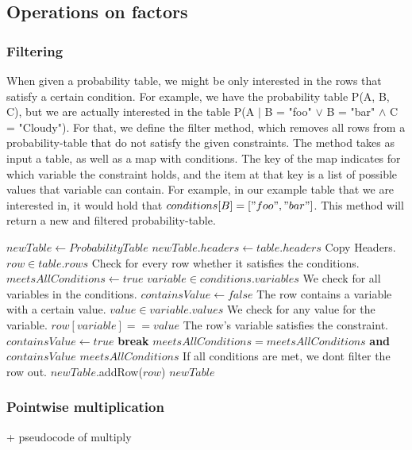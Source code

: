 \documentclass[10pt,a4paper]{article}
\begin{document}
\subsection{Operations on factors}
\subsubsection{Filtering}
When given a probability table, we might be only interested in the rows that satisfy a certain condition. For example, we have the probability table P(A, B, C), but we are actually interested in the table P(A $|$ B = "foo" $\vee$ B = "bar" $\wedge$ C = "Cloudy"). For that, we define the {\sc filter} method, which removes all rows from a probability-table that do not satisfy the given constraints. The method takes as input a table, as well as a map with conditions. The key of the map indicates for which variable the constraint holds, and the item at that key is a list of possible values that variable can contain. For example, in our example table that we are interested in, it would hold that $conditions[B] = [ "foo", "bar" ]$. This method will return a new and filtered probability-table.
\begin{codebox}
\li $newTable \gets ProbabilityTable$
\li $newTable.headers \gets table.headers$ \Comment Copy Headers.
\li \For $row \in table.rows$ \Comment Check for every row whether it satisfies the conditions. \Do
\li     $meetsAllConditions \gets true$
\li     \For $variable \in conditions.variables$ \Comment We check for all variables in the conditions. \Do
\li         $containsValue \gets false$ \Comment The row contains a variable with a certain value.
\li         \For $value \in variable.values$ \Comment We check for any value for the variable. \Do
\li             \If $row[variable] == value$ \Comment The row's variable satisfies the constraint. \Then
\li                 $containsValue \gets true$
\li                 \textbf{break}
                \End
            \End
\li         $meetsAllConditions = meetsAllConditions$ \textbf{and} $containsValue$
        \End
\li     \If $meetsAllConditions$ \Comment If all conditions are met, we dont filter the row out. \Then
\li         $newTable$.addRow($row$)
        \End
    \End
\li \Return $newTable$
\end{codebox}
\subsubsection{Pointwise multiplication}
+ pseudocode of multiply
\end{document}
